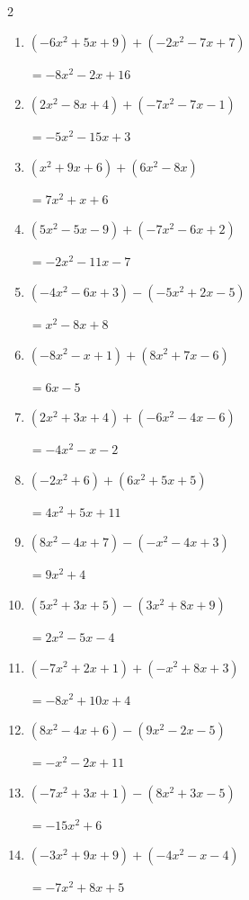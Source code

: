 \begin{multicols}{2}
\begin{enumerate}
  \item $(-6x^{2}+5x+9)+(-2x^{2}-7x+7)$

        $=-8x^{2}-2x+16$

\columnbreak %

  \item $(2x^{2}-8x+4)+(-7x^{2}-7x-1)$

        $=-5x^{2}-15x+3$

  \item $(x^{2}+9x+6)+(6x^{2}-8x)$

        $=7x^{2}+x+6$

  \item $(5x^{2}-5x-9)+(-7x^{2}-6x+2)$

        $=-2x^{2}-11x-7$

  \item $(-4x^{2}-6x+3)-(-5x^{2}+2x-5)$

        $=x^{2}-8x+8$

  \item $(-8x^{2}-x+1)+(8x^{2}+7x-6)$

        $=6x-5$

  \item $(2x^{2}+3x+4)+(-6x^{2}-4x-6)$

        $=-4x^{2}-x-2$

  \item $(-2x^{2}+6)+(6x^{2}+5x+5)$

        $=4x^{2}+5x+11$

  \item $(8x^{2}-4x+7)-(-x^{2}-4x+3)$

        $=9x^{2}+4$

  \item $(5x^{2}+3x+5)-(3x^{2}+8x+9)$

        $=2x^{2}-5x-4$

  \item $(-7x^{2}+2x+1)+(-x^{2}+8x+3)$

        $=-8x^{2}+10x+4$

  \item $(8x^{2}-4x+6)-(9x^{2}-2x-5)$

        $=-x^{2}-2x+11$

  \item $(-7x^{2}+3x+1)-(8x^{2}+3x-5)$

        $=-15x^{2}+6$

  \item $(-3x^{2}+9x+9)+(-4x^{2}-x-4)$

        $=-7x^{2}+8x+5$


\end{enumerate}
\end{multicols}
